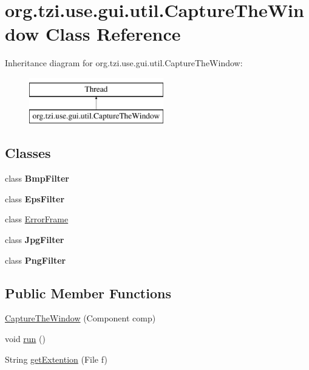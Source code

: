 \hypertarget{classorg_1_1tzi_1_1use_1_1gui_1_1util_1_1_capture_the_window}{\section{org.\-tzi.\-use.\-gui.\-util.\-Capture\-The\-Window Class Reference}
\label{classorg_1_1tzi_1_1use_1_1gui_1_1util_1_1_capture_the_window}
}
Inheritance diagram for org.\-tzi.\-use.\-gui.\-util.\-Capture\-The\-Window\-:\begin{figure}[H]
\begin{center}
\leavevmode
\includegraphics[height=2.000000cm]{classorg_1_1tzi_1_1use_1_1gui_1_1util_1_1_capture_the_window}
\end{center}
\end{figure}
\subsection*{Classes}
\begin{DoxyCompactItemize}
\item 
class {\bfseries Bmp\-Filter}
\item 
class {\bfseries Eps\-Filter}
\item 
class \hyperlink{classorg_1_1tzi_1_1use_1_1gui_1_1util_1_1_capture_the_window_1_1_error_frame}{Error\-Frame}
\item 
class {\bfseries Jpg\-Filter}
\item 
class {\bfseries Png\-Filter}
\end{DoxyCompactItemize}
\subsection*{Public Member Functions}
\begin{DoxyCompactItemize}
\item 
\hyperlink{classorg_1_1tzi_1_1use_1_1gui_1_1util_1_1_capture_the_window_a2bb8cae04fdfde314634b4e7fe61561c}{Capture\-The\-Window} (Component comp)
\item 
void \hyperlink{classorg_1_1tzi_1_1use_1_1gui_1_1util_1_1_capture_the_window_ae2e1d99e13b1d2fcfd8ea25c82f0a13e}{run} ()
\item 
String \hyperlink{classorg_1_1tzi_1_1use_1_1gui_1_1util_1_1_capture_the_window_afd56eb193dc6bb55eadf44fa7fe6c979}{get\-Extention} (File f)
\end{DoxyCompactItemize}


